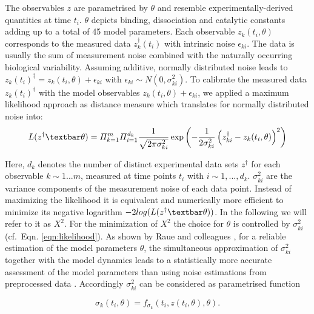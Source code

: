 The observables $z$ are parametrised by $\theta$ and resemble experimentally-derived quantities at time $t_i$. $\theta$ depicts binding, dissociation and catalytic constants adding up to a total of 45 model parameters. Each observable $z_k(t_i,\theta)$ corresponds to the measured data $z_k^\dag(t_i)$ with intrinsic noise $\epsilon_{ki}$. The data is usually the sum of measurement noise combined with the naturally occurring biological variability. Assuming additive, normally distributed noise leads to $z_k(t_i)^\dag = z_k(t_i,\theta) + \epsilon_{ki}$ with $\epsilon_{ki} \sim N(0,\sigma_{ki}^2)$. To calibrate the measured data $z_k(t_i)^\dag$ with the model observables $z_k(t_i,\theta)+\epsilon_{ki}$, we applied a maximum likelihood approach as distance measure which translates for normally distributed noise into:
\begin{equation}
\label{eqn:likelihood}
L(z^\dag \textbar \theta) = \varPi_{k=1}^m \varPi_{i=1}^{d_k} \frac{1}{\sqrt{2\pi \sigma_{ki}^2}}\exp \left( -\frac{1}{2\sigma_{ki}^2}\left(z_{ki}^\dag - z_k(t_i,\theta)\right)^2\right)
\end{equation}
  
Here, $d_k$ denotes the number of distinct experimental data sets $z^\dag$ for each observable $k\sim 1 ...m$, measured at time points $t_i$ with $i\sim 1,...,d_k$. $\sigma_{ki}^2$ are the variance components of the measurement noise of each data point. Instead of maximizing the likelihood it is equivalent and numerically more efficient to minimize its negative logarithm $-2log(L(z^\dag\textbar\theta))$. In the following we will refer to it as $X^2$.  For the minimization of $X^2$ the choice for $\theta$ is controlled by $\sigma_{ki}^2$ (cf.\ Eqn. \ref{eqn:likelihood}). As shown by Raue and colleagues \cite{Raue2013}, for a reliable estimation of the model parameters $\theta$, the simultaneous approximation of $\sigma_{ki}^2$ together with the model dynamics leads to a statistically more accurate assessment of the model parameters than using noise estimations from preprocessed data \cite{Raue2013}. Accordingly $\sigma_{ki}^2$ can be considered as parametrised function

\begin{equation}
\sigma_{k}(t_i,\theta) = f_{\sigma_{k}}(t_i,z(t_i,\theta),\theta).
\end{equation}    

